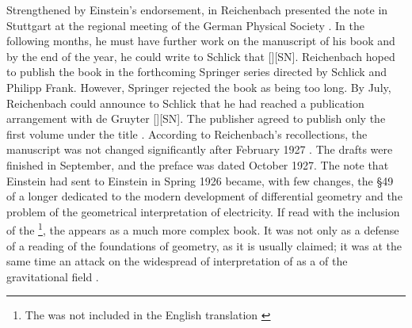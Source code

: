 \documentclass[final]{article}
\newcommand{\PRZL}{\citetitle{Reichenbach1928}\xspace}
\newcommand{\Reich}{Reichenbach\xspace}
\begin{document}
Strengthened by Einstein's endorsement, in  Reichenbach presented the note in Stuttgart at the regional meeting of the German Physical Society \citep{Reichenbach1926d}. In the following months, he must have further work on the manuscript of his book and by the end of the year, he could write to Schlick that  [][SN]\label{RZL1926}. Reichenbach hoped to publish the book in the forthcoming Springer series  directed by Schlick and Philipp Frank. However, Springer rejected the book as being too long. By July, Reichenbach could announce to Schlick that he had reached a publication arrangement with de Gruyter [][SN]. The publisher agreed to publish only the first volume under the title . According to \Reich's recollections, the manuscript was not changed significantly after February 1927 \citep[044-06-25]{HR}. The drafts were finished in September, and the preface was dated October 1927. The note that Einstein had sent to Einstein in Spring 1926 became, with few changes, the \S49 of a longer \Ap dedicated to the modern development of differential geometry and the problem of the geometrical interpretation of electricity. If read with the inclusion of the \Ap\footnote{The \Ap was not included in the English translation \cite{Reichenbach1958}}, the \PRZL appears as a much more complex book. It was not only as a defense of a  reading of the foundations of geometry, as it is usually claimed; it was at the same time an attack on the widespread of interpretation of \gr as a  of the gravitational field .
\end{document}
